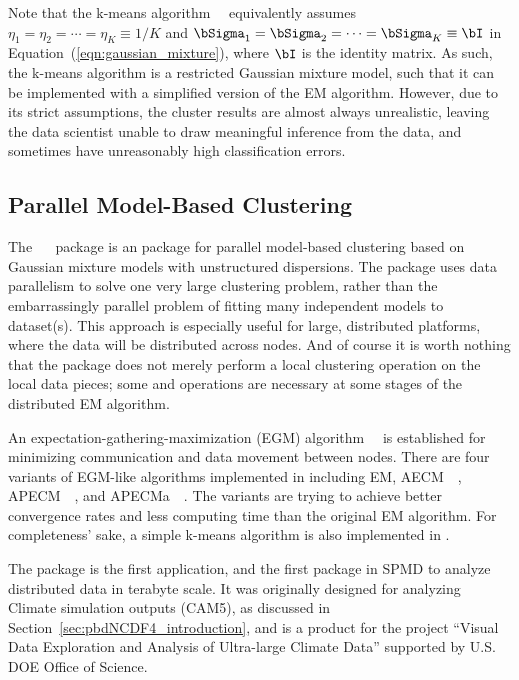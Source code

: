 Note that the k-means algorithm~\citep{Forgy1965}~
equivalently assumes
$\eta_1 = \eta_2 = \cdots = \eta_K \equiv 1/K$ and
$\bSigma_1 = \bSigma_2 = \cdots = \bSigma_K \equiv \bI$
in Equation~(\ref{eqn:gaussian_mixture}), where
$\bI$ is the identity matrix.
As such, the k-means algorithm is a restricted Gaussian mixture model, such that
it can be implemented with a simplified version of the EM algorithm.
However, due to its strict assumptions, the cluster results are almost always unrealistic, leaving the data scientist unable to draw meaningful inference from the data, and sometimes have unreasonably high classification errors.


\subsection{Parallel Model-Based Clustering}

The ~\citep{Chen2012pmclustpackage}~ package is an 
package for parallel model-based clustering based on Gaussian mixture models
with unstructured dispersions.  The package uses data parallelism to solve one very large clustering problem, rather than the embarrassingly parallel problem of fitting many independent models to dataset(s).  This approach is especially useful for large, distributed platforms, where the data will be distributed across nodes.  And of course it is worth nothing that the package does not merely perform a local clustering operation on the local data pieces; some  and  operations are necessary at some stages of the distributed EM algorithm.

An expectation-gathering-maximization (EGM)
algorithm~\citep{Chen2013}~
is established for minimizing communication and data movement between nodes.
There are four variants of EGM-like algorithms implemented in 
including EM, AECM~\citep{Meng1997}~,
APECM~\citep{Chen2011}~, and APECMa~\citep{Chen2013}~. The variants are trying to achieve
better convergence rates and less computing time than the original EM algorithm.
For completeness' sake, a simple k-means algorithm is also implemented in .

The  package is the first
 application, and the first
 package in SPMD to analyze distributed data in terabyte scale.
It was originally designed for analyzing Climate simulation outputs (CAM5),
as discussed in Section~\ref{sec:pbdNCDF4_introduction}, and
is a product for the project
``Visual Data Exploration and Analysis of Ultra-large Climate Data''
supported by U.S. DOE Office of Science.

